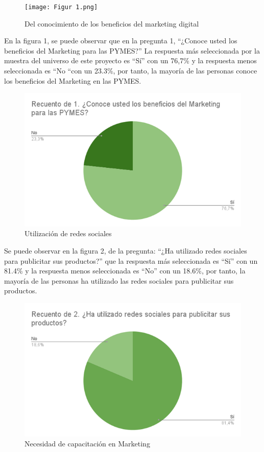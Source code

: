\documentclass[12pt]{difu100cia} %
\begin{document}
\begin{figure}[!htb]
	\centering
	\texttt{[image: Figur 1.png]}
	\caption{Del conocimiento de los beneficios del marketing digital}
	\label{Figur 1}
\end{figure}
	

En la figura 1, se puede observar que en la pregunta 1, “¿Conoce usted los beneficios del Marketing para las PYMES?” La respuesta más seleccionada por la muestra del universo de este proyecto es “Sí” con un 76,7\% y la respuesta menos seleccionada es “No “con un 23.3\%, por tanto, la mayoría de las personas conoce los beneficios del Marketing en las PYMES.

\begin{figure}[!htb]
	\centering
	\includegraphics[width=\linewidth]{Figura 2.png}
	\caption{Utilización de redes sociales}
	\label{Figur 2}
\end{figure}
	
Se puede observar en la figura 2, de la pregunta: “¿Ha utilizado redes sociales para publicitar sus productos?” que la respuesta más seleccionada es “Sí” con un 81.4\% y la respuesta menos seleccionada es “No” con un 18.6\%, por tanto, la mayoría de las personas ha utilizado las redes sociales para publicitar sus productos.


\begin{figure}[!htb]
	\centering
	\includegraphics[width=\linewidth]{Figura 3.png}
	\caption{Necesidad de capacitación en Marketing}
	\label{Figur 3}
\end{figure}
	
\end{document}
